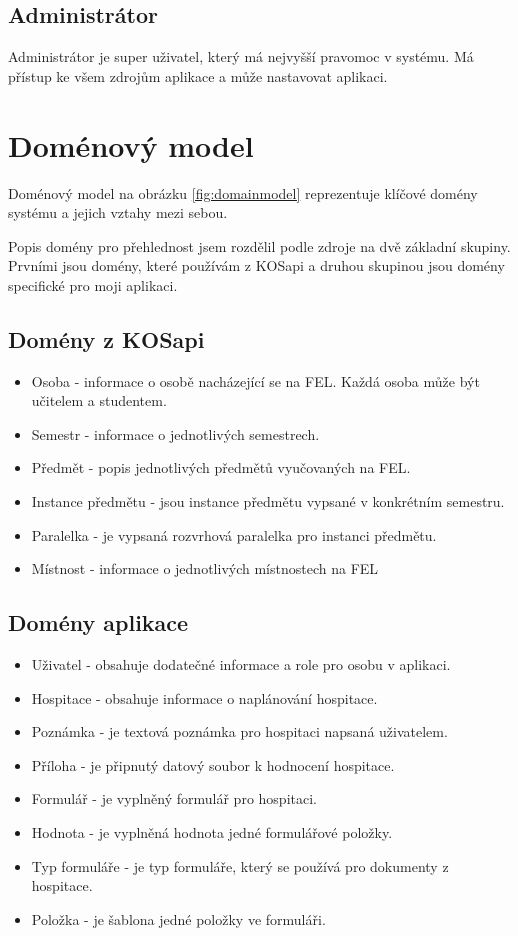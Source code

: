 \subsection{Administrátor}
Administrátor je super uživatel, který má nejvyšší pravomoc v systému. Má přístup ke všem zdrojům aplikace a může nastavovat aplikaci.

\section{Doménový model}
Doménový model na obrázku \ref{fig:domainmodel} reprezentuje klíčové domény systému a jejich vztahy mezi sebou. 

Popis domény pro přehlednost jsem rozdělil podle zdroje na dvě základní skupiny. Prvními jsou domény, které používám z KOSapi a druhou skupinou jsou domény specifické pro moji aplikaci. 

\subsection{Domény z KOSapi}
\begin{itemize}
\item Osoba - informace o osobě nacházející se na FEL. Každá osoba může být učitelem a studentem.
\item Semestr - informace o jednotlivých semestrech. 
\item Předmět - popis jednotlivých předmětů vyučovaných na FEL.
\item Instance předmětu - jsou instance předmětu vypsané v konkrétním semestru.
\item Paralelka - je vypsaná rozvrhová paralelka pro instanci předmětu.
\item Místnost - informace o jednotlivých místnostech na FEL
\end{itemize}

\subsection{Domény aplikace}
\begin{itemize}
\item Uživatel - obsahuje dodatečné informace a role pro osobu v aplikaci.
\item Hospitace - obsahuje informace o naplánování hospitace. 
\item Poznámka - je textová poznámka pro hospitaci napsaná uživatelem.
\item Příloha - je připnutý datový soubor k hodnocení hospitace.
\item Formulář - je vyplněný formulář pro hospitaci.
\item Hodnota - je vyplněná hodnota jedné formulářové položky.
\item Typ formuláře - je typ formuláře, který se používá pro dokumenty z hospitace. 
\item Položka - je šablona jedné položky ve formuláři.
\end{itemize}

